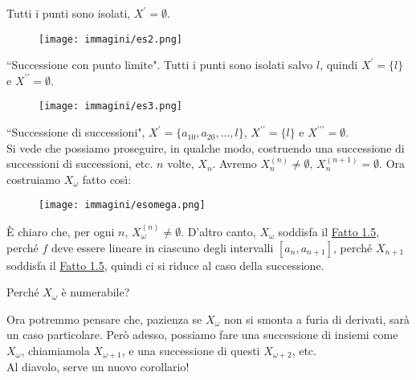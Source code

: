 \documentclass[11pt]{scrartcl}
\begin{document}
Tutti i punti sono isolati, $X^{\prime} = \emptyset$.

\pagebreak

\begin{center}
	\begin{figure}[h]
		\centering
		\texttt{[image: immagini/es2.png]}
	\end{figure}
\end{center}

``Successione con punto limite". Tutti i punti sono isolati salvo $l$, quindi $X^{\prime} = \{l\}$ e $X^{\prime\prime} = \emptyset$.

\begin{center}
	\begin{figure}[h]
		\centering
		\texttt{[image: immagini/es3.png]}
	\end{figure}
\end{center}

``Successione di successioni", $X^{\prime} = \{a_{10}, a_{20}, \ldots, l\}$, $X^{\prime\prime} = \{l\}$ e $X^{\prime\prime\prime} = \emptyset$.\\
Si vede che possiamo proseguire, in qualche modo, costruendo una successione di successioni di successioni, etc. $n$ volte, $X_n$. Avremo $X_n^{(n)} \ne \emptyset$, $X_n^{(n+1)} = \emptyset$. Ora costruiamo 
$X_{\omega}$ fatto così:

\begin{center}
	\begin{figure}[h]
		\centering
		\texttt{[image: immagini/esomega.png]}
	\end{figure}
\end{center}

È chiaro che, per ogni $n$, $X_\omega^{(n)} \ne \emptyset$. D'altro canto, $X_\omega$ soddisfa il \hyperref[unicità]{Fatto 1.5}, perché $f$ deve essere lineare in ciascuno degli intervalli
$[a_n,a_{n+1}]$, perché $X_{n+1}$ soddisfa il \hyperref[unicità]{Fatto 1.5}, quindi ci si riduce al caso della successione.

\begin{exercise}
Perché $X_\omega$ è numerabile?
\end{exercise}

Ora potremmo pensare che, pazienza se $X_\omega$ non si smonta a furia di derivati, sarà un caso particolare. Però adesso, possiamo fare una successione di insiemi come $X_\omega$, chiamiamola $X_{\omega+1}$, e 
una successione di questi $X_{\omega+2}$, etc.\\
Al diavolo, serve un nuovo corollario!
\end{document}

